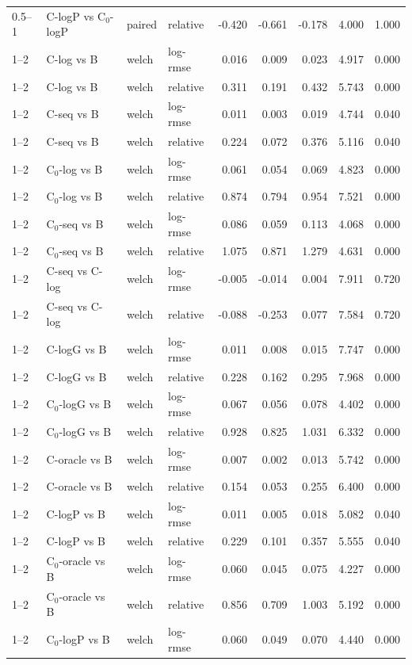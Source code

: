 \begin{longtable}{llllrrrrr}
0.5–1 & C-logP vs C$_0$-logP & paired & relative & -0.420 & -0.661 & -0.178 & 4.000 & 1.000 \\
1–2 & C-log vs B & welch & log-rmse & 0.016 & 0.009 & 0.023 & 4.917 & 0.000 \\
1–2 & C-log vs B & welch & relative & 0.311 & 0.191 & 0.432 & 5.743 & 0.000 \\
1–2 & C-seq vs B & welch & log-rmse & 0.011 & 0.003 & 0.019 & 4.744 & 0.040 \\
1–2 & C-seq vs B & welch & relative & 0.224 & 0.072 & 0.376 & 5.116 & 0.040 \\
1–2 & C$_0$-log vs B & welch & log-rmse & 0.061 & 0.054 & 0.069 & 4.823 & 0.000 \\
1–2 & C$_0$-log vs B & welch & relative & 0.874 & 0.794 & 0.954 & 7.521 & 0.000 \\
1–2 & C$_0$-seq vs B & welch & log-rmse & 0.086 & 0.059 & 0.113 & 4.068 & 0.000 \\
1–2 & C$_0$-seq vs B & welch & relative & 1.075 & 0.871 & 1.279 & 4.631 & 0.000 \\
1–2 & C-seq vs C-log & welch & log-rmse & -0.005 & -0.014 & 0.004 & 7.911 & 0.720 \\
1–2 & C-seq vs C-log & welch & relative & -0.088 & -0.253 & 0.077 & 7.584 & 0.720 \\
1–2 & C-logG vs B & welch & log-rmse & 0.011 & 0.008 & 0.015 & 7.747 & 0.000 \\
1–2 & C-logG vs B & welch & relative & 0.228 & 0.162 & 0.295 & 7.968 & 0.000 \\
1–2 & C$_0$-logG vs B & welch & log-rmse & 0.067 & 0.056 & 0.078 & 4.402 & 0.000 \\
1–2 & C$_0$-logG vs B & welch & relative & 0.928 & 0.825 & 1.031 & 6.332 & 0.000 \\
1–2 & C-oracle vs B & welch & log-rmse & 0.007 & 0.002 & 0.013 & 5.742 & 0.000 \\
1–2 & C-oracle vs B & welch & relative & 0.154 & 0.053 & 0.255 & 6.400 & 0.000 \\
1–2 & C-logP vs B & welch & log-rmse & 0.011 & 0.005 & 0.018 & 5.082 & 0.040 \\
1–2 & C-logP vs B & welch & relative & 0.229 & 0.101 & 0.357 & 5.555 & 0.040 \\
1–2 & C$_0$-oracle vs B & welch & log-rmse & 0.060 & 0.045 & 0.075 & 4.227 & 0.000 \\
1–2 & C$_0$-oracle vs B & welch & relative & 0.856 & 0.709 & 1.003 & 5.192 & 0.000 \\
1–2 & C$_0$-logP vs B & welch & log-rmse & 0.060 & 0.049 & 0.070 & 4.440 & 0.000 \\

\end{longtable}
